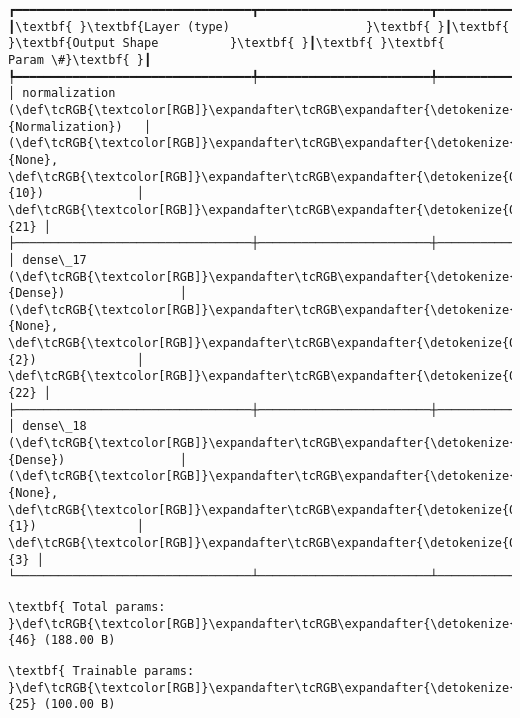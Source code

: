 \documentclass[11pt]{article}
\begin{document}
    \begin{Verbatim}[commandchars=\\\{\}]
┏━━━━━━━━━━━━━━━━━━━━━━━━━━━━━━━━━┳━━━━━━━━━━━━━━━━━━━━━━━━┳━━━━━━━━━━━━━━━┓
┃\textbf{ }\textbf{Layer (type)                   }\textbf{ }┃\textbf{ }\textbf{Output Shape          }\textbf{ }┃\textbf{ }\textbf{      Param \#}\textbf{ }┃
┡━━━━━━━━━━━━━━━━━━━━━━━━━━━━━━━━━╇━━━━━━━━━━━━━━━━━━━━━━━━╇━━━━━━━━━━━━━━━┩
│ normalization (\def\tcRGB{\textcolor[RGB]}\expandafter\tcRGB\expandafter{\detokenize{0,135,255}}{Normalization})   │ (\def\tcRGB{\textcolor[RGB]}\expandafter\tcRGB\expandafter{\detokenize{0,215,255}}{None}, \def\tcRGB{\textcolor[RGB]}\expandafter\tcRGB\expandafter{\detokenize{0,175,0}}{10})             │            \def\tcRGB{\textcolor[RGB]}\expandafter\tcRGB\expandafter{\detokenize{0,175,0}}{21} │
├─────────────────────────────────┼────────────────────────┼───────────────┤
│ dense\_17 (\def\tcRGB{\textcolor[RGB]}\expandafter\tcRGB\expandafter{\detokenize{0,135,255}}{Dense})                │ (\def\tcRGB{\textcolor[RGB]}\expandafter\tcRGB\expandafter{\detokenize{0,215,255}}{None}, \def\tcRGB{\textcolor[RGB]}\expandafter\tcRGB\expandafter{\detokenize{0,175,0}}{2})              │            \def\tcRGB{\textcolor[RGB]}\expandafter\tcRGB\expandafter{\detokenize{0,175,0}}{22} │
├─────────────────────────────────┼────────────────────────┼───────────────┤
│ dense\_18 (\def\tcRGB{\textcolor[RGB]}\expandafter\tcRGB\expandafter{\detokenize{0,135,255}}{Dense})                │ (\def\tcRGB{\textcolor[RGB]}\expandafter\tcRGB\expandafter{\detokenize{0,215,255}}{None}, \def\tcRGB{\textcolor[RGB]}\expandafter\tcRGB\expandafter{\detokenize{0,175,0}}{1})              │             \def\tcRGB{\textcolor[RGB]}\expandafter\tcRGB\expandafter{\detokenize{0,175,0}}{3} │
└─────────────────────────────────┴────────────────────────┴───────────────┘

    \end{Verbatim}

    
    
    \begin{Verbatim}[commandchars=\\\{\}]
\textbf{ Total params: }\def\tcRGB{\textcolor[RGB]}\expandafter\tcRGB\expandafter{\detokenize{0,175,0}}{46} (188.00 B)

    \end{Verbatim}

    
    
    \begin{Verbatim}[commandchars=\\\{\}]
\textbf{ Trainable params: }\def\tcRGB{\textcolor[RGB]}\expandafter\tcRGB\expandafter{\detokenize{0,175,0}}{25} (100.00 B)

    \end{Verbatim}
\end{document}
